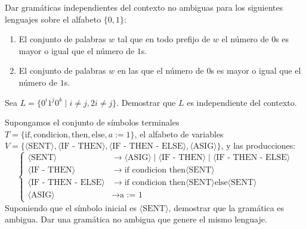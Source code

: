 \begin{ejercicio}\label{ej:1.4.20}
    Dar gramáticas independientes del contexto no ambiguas para los siguientes lenguajes sobre el alfabeto $\{ 0, 1 \}$:
    \begin{enumerate}
        \item El conjunto de palabras $w$ tal que en todo prefijo de $w$ el número de $0$s es mayor o igual que el número de $1$s.
        \item El conjunto de palabras $w$ en las que el número de $0$s es mayor o igual que el número de $1$s.
    \end{enumerate}
\end{ejercicio}

\begin{ejercicio}\label{ej:1.4.21}
    Sea $L = \{ 0^i 1^j 0^k \mid i \neq j, 2i \neq j \}$. Demostrar que $L$ es independiente del contexto.
\end{ejercicio}

\begin{ejercicio}\label{ej:1.4.22}
    Supongamos el conjunto de símbolos terminales $T = \{ \text{if}, \text{condicion}, \text{then}, \text{else}, a := 1 \}$, el alfabeto de variables $V = \{ \langle \text{SENT} \rangle, \langle \text{IF - THEN} \rangle, \langle \text{IF - THEN - ELSE} \rangle, \langle \text{ASIG} \rangle \}$, y las producciones:
    \begin{equation*}
        \left\{
            \begin{aligned}
                \langle \text{SENT} \rangle &\rightarrow \langle \text{ASIG} \rangle \mid \langle \text{IF - THEN} \rangle \mid \langle \text{IF - THEN - ELSE} \rangle\\
                \langle \text{IF - THEN} \rangle &\rightarrow \text{if condicion then} \langle \text{SENT} \rangle\\
                \langle \text{IF - THEN - ELSE} \rangle &\rightarrow \text{if condicion then} \langle \text{SENT} \rangle \text{else} \langle \text{SENT} \rangle\\
                \langle \text{ASIG} \rangle &\rightarrow \text{a := 1}
            \end{aligned}
        \right.
    \end{equation*}
    Suponiendo que el símbolo inicial es $\langle \text{SENT} \rangle$, demostrar que la gramática es ambigua. Dar una gramática no ambigua que genere el mismo lenguaje.
\end{ejercicio}

